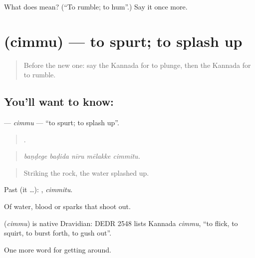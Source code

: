 \begin{tcolorbox}[breakable,colback=teal!4,colframe=teal!35!black,title={Before you move on}]
What does  mean? (\textquotedblleft{}To rumble; to hum\textquotedblright{}.) Say it once more.
\end{tcolorbox}
\section[\texorpdfstring{\kn{ಚಿಮ್ಮು} (cimmu)}{ಚಿಮ್ಮು (cimmu)}]{ (cimmu) — to spurt; to splash up}

\label{lesson:KA-C482-cimmu}



\begin{quote}
Before the new one: say the Kannada for to plunge, then the Kannada for to rumble.
\end{quote}

\subsection*{You'll want to know: }
\textbf{} — \emph{cimmu} — \textquotedblleft{}to spurt; to splash up\textquotedblright{}.

\begin{quote}
    .
\end{quote}

\begin{quote}
\emph{baṇḍege baḍida nīru mēlakke cimmitu.}
\end{quote}

\begin{quote}
Striking the rock, the water splashed up.
\end{quote}

Past (it …): , \emph{cimmitu}.

Of water, blood or sparks that shoot out.

\begin{cousinweb}
\textbf{} (\emph{cimmu}) is native Dravidian: DEDR 2548 lists Kannada \emph{cimmu}, \textquotedblleft{}to flick, to squirt, to burst forth, to gush out\textquotedblright{}.
\end{cousinweb}

\begin{grammarlens}[title={What you've built}]
One more word for getting around.
\end{grammarlens}

